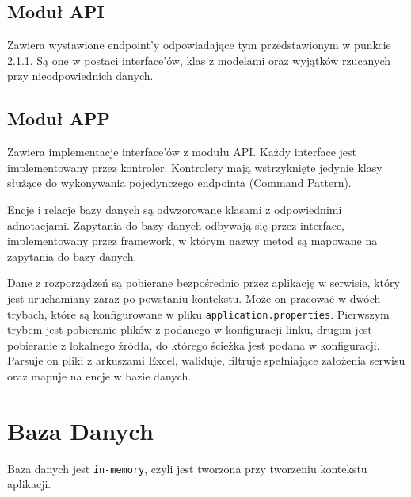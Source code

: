 \documentclass{article}
\begin{document}
    \subsection{Moduł API}
    Zawiera wystawione endpoint'y odpowiadające tym przedstawionym w punkcie 2.1.1.
    Są one w postaci interface'ów, klas z modelami oraz wyjątków rzucanych przy nieodpowiednich danych.

    \subsection{Moduł APP}
    Zawiera implementacje interface'ów z modułu API.
    Każdy interface jest implementowany przez kontroler.
    Kontrolery mają wstrzyknięte jedynie klasy służące do wykonywania pojedynczego endpointa (Command Pattern).

    Encje i relacje bazy danych są odwzorowane klasami z odpowiednimi adnotacjami.
    Zapytania do bazy danych odbywają się przez interface, implementowany przez framework,
    w którym nazwy metod są mapowane na zapytania do bazy danych.

    Dane z rozporządzeń są pobierane bezpośrednio przez aplikację w serwisie, który jest uruchamiany zaraz po powstaniu kontekstu.
    Może on pracować w dwóch trybach, które są konfigurowane w pliku \texttt{application.properties}.
    Pierwszym trybem jest pobieranie plików z podanego w konfiguracji linku,
    drugim jest pobieranie z lokalnego źródła, do którego ścieżka jest podana w konfiguracji.
    Parsuje on pliki z arkuszami Excel, waliduje, filtruje spełniające założenia serwisu oraz mapuje na encje w bazie danych.
  \section{Baza Danych}
  Baza danych jest \texttt{in-memory}, czyli jest tworzona przy tworzeniu kontekstu aplikacji.
\end{document}
